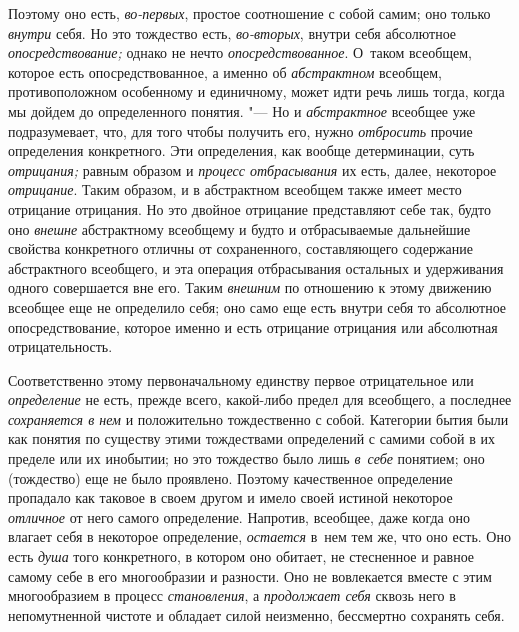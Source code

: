Поэтому оно есть, {\em во-первых}, простое соотношение с собой самим; оно
только {\em внутри} себя. Но это тождество есть, {\em во-вторых}, внутри себя
абсолютное {\em опосредствование;} однако не нечто {\em опосредствованное}.
О~таком всеобщем, которое есть опосредствованное, а именно об {\em абстрактном}
всеобщем, противоположном особенному и единичному, может идти речь лишь тогда,
когда мы дойдем до определенного понятия. "--- Но и {\em абстрактное} всеобщее
уже подразумевает, что, для того чтобы получить его, нужно {\em отбросить}
прочие определения конкретного. Эти определения, как вообще детерминации, суть
{\em отрицания;} равным образом и {\em процесс отбрасывания} их есть, далее,
некоторое {\em отрицание}. Таким образом, и в абстрактном всеобщем также имеет
место отрицание отрицания. Но это двойное отрицание представляют себе так,
будто оно {\em внешне} абстрактному всеобщему и будто и отбрасываемые
дальнейшие свойства конкретного отличны от сохраненного, составляющего
содержание абстрактного всеобщего, и эта операция отбрасывания остальных и
удерживания одного совершается вне его. Таким {\em внешним} по отношению к
этому движению всеобщее еще не определило себя; оно само еще есть внутри себя
то абсолютное опосредствование, которое именно и есть отрицание отрицания или
абсолютная отрицательность.

Соответственно этому первоначальному единству первое отрицательное или
{\em определение} не есть, прежде всего, какой-либо предел для всеобщего,
а последнее {\em сохраняется в нем} и положительно тождественно с собой.
Категории бытия были как понятия по существу этими тождествами определений
с самими собой в их пределе или их инобытии; но это тождество было лишь
{\em в~себе} понятием; оно (тождество) еще не было проявлено. Поэтому
качественное определение пропадало как таковое в своем другом и имело своей
истиной некоторое {\em отличное} от него самого определение. Напротив,
всеобщее, даже когда оно влагает себя в некоторое определение, {\em остается}
в~нем тем же, что оно есть. Оно есть {\em душа} того конкретного, в котором оно
обитает, не стесненное и равное самому себе в его многообразии и разности. Оно
не вовлекается вместе с этим многообразием в процесс {\em становления},
а {\em продолжает себя} сквозь него в непомутненной чистоте и обладает силой
неизменно, бессмертно сохранять себя.

